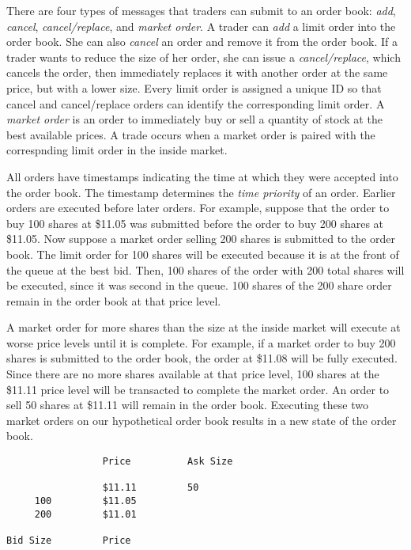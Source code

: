 \documentclass[a4paper]{report}
\begin{document}
\begin{article}
There are four types of messages that traders can submit to an order
book: \emph{add}, \emph{cancel}, \emph{cancel/replace}, and
\emph{market order}. A trader can \emph{add} a limit order into the
order book.  She can also \emph{cancel} an order and remove it from
the order book. If a trader wants to reduce the size of her order, she
can issue a \emph{cancel/replace}, which cancels the order, then
immediately replaces it with another order at the same price, but with
a lower size. Every limit order is assigned a unique ID so that cancel
and cancel/replace orders can identify the corresponding limit
order. A \emph{market order} is an order to immediately buy or sell a
quantity of stock at the best available prices. A trade occurs when a
market order is paired with the correspnding limit order in the inside market.

All orders have timestamps indicating the time at which they were
accepted into the order book. The timestamp determines the \emph{time
  priority} of an order. Earlier orders are executed before later
orders. For example, suppose that the order to buy 100 shares at
\$11.05 was submitted before the order to buy 200 shares at
\$11.05. Now suppose a market order selling 200 shares is submitted to
the order book. The limit order for 100 shares will be executed
because it is at the front of the queue at the best bid. Then, 100
shares of the order with 200 total shares will be executed, since it
was second in the queue. 100 shares of the 200 share order remain in
the order book at that price level.

A market order for more shares than the size at the inside market will
execute at worse price levels until it is complete. For example, if a
market order to buy 200 shares is submitted to the order book, the
order at \$11.08 will be fully executed. Since there are no more
shares available at that price level, 100 shares at the \$11.11 price
level will be transacted to complete the market order. An order to
sell 50 shares at \$11.11 will remain in the order book. Executing
these two market orders on our hypothetical order book results in a
new state of the order book.

\begin{verbatim}
                 Price          Ask Size

                 $11.11         50
     100         $11.05
     200         $11.01

Bid Size         Price
\end{verbatim}


\end{article}
\end{document}
